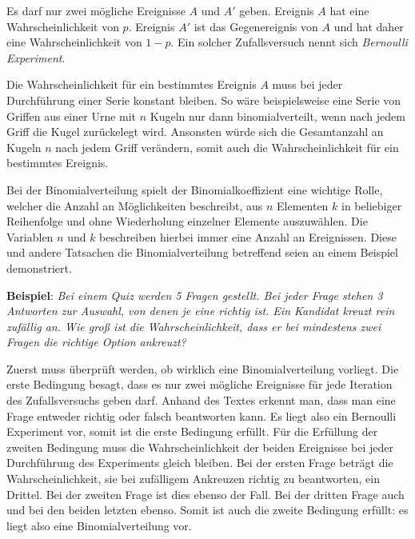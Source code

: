 \begin{enumerate}


	Es darf nur zwei m\"{o}gliche Ereignisse $A$ und $A'$ geben. Ereignis $A$ hat eine Wahrscheinlichkeit von $p$. Ereignis $A'$ ist das Gegenereignis von $A$ und hat daher eine Wahrscheinlichkeit von $1 - p$. Ein solcher Zufallsversuch nennt sich \emph{Bernoulli Experiment}.


	Die Wahrscheinlichkeit f\"{u}r ein bestimmtes Ereignis $A$ muss bei jeder Durchf\"{u}hrung einer Serie konstant bleiben. So w\"{a}re beispielsweise eine Serie von Griffen aus einer Urne mit $n$ Kugeln nur dann binomialverteilt, wenn nach jedem Griff die Kugel zur\"{u}ckelegt wird. Ansonsten w\"{u}rde sich die Gesamtanzahl an Kugeln $n$ nach jedem Griff ver\"{a}ndern, somit auch die Wahrscheinlichkeit f\"{u}r ein bestimmtes Ereignis.
\end{enumerate}

Bei der Binomialverteilung spielt der Binomialkoeffizient eine wichtige Rolle, welcher die Anzahl an M\"{o}glichkeiten beschreibt, aus $n$ Elementen $k$ in beliebiger Reihenfolge und ohne Wiederholung einzelner Elemente auszuw\"{a}hlen. Die Variablen $n$ und $k$ beschreiben hierbei immer eine Anzahl an Ereignissen. Diese und andere Tatsachen die Binomialverteilung betreffend seien an einem Beispiel demonstriert.

\textbf{Beispiel}: \emph{Bei einem Quiz werden 5 Fragen gestellt. Bei jeder Frage stehen 3 Antworten zur Auswahl, von denen je eine richtig ist. Ein Kandidat kreuzt rein zuf\"{a}llig an. Wie gro\ss{} ist die Wahrscheinlichkeit, dass er bei mindestens zwei Fragen die richtige Option ankreuzt?}

Zuerst muss \"{u}berpr\"{u}ft werden, ob wirklich eine Binomialverteilung vorliegt. Die erste Bedingung besagt, dass es nur zwei m\"{o}gliche Ereignisse f\"{u}r jede Iteration des Zufallsversuchs geben darf. Anhand des Textes erkennt man, dass man eine Frage entweder richtig oder falsch beantworten kann. Es liegt also ein Bernoulli Experiment vor, somit ist die erste Bedingung erf\"{u}llt. F\"{u}r die Erf\"{u}llung der zweiten Bedingung muss die Wahrscheinlichkeit der beiden Ereignisse bei jeder Durchf\"{u}hrung des Experiments gleich bleiben. Bei der ersten Frage betr\"{a}gt die Wahrscheinlichkeit, sie bei zuf\"{a}lligem Ankreuzen richtig zu beantworten, ein Drittel. Bei der zweiten Frage ist dies ebenso der Fall. Bei der dritten Frage auch und bei den beiden letzten ebenso. Somit ist auch die zweite Bedingung erf\"{u}llt: es liegt also eine Binomialverteilung vor.

